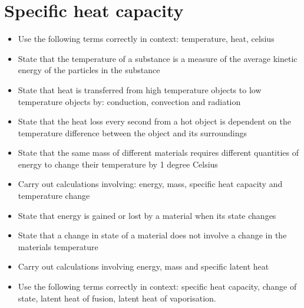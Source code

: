 \section{Specific heat capacity}
\begin{multicols}{2}
	\begin{itemize}
		\item Use the following terms correctly in context: temperature, heat, 
			celsius
		\item  State that the temperature of a substance is a measure of the average
			kinetic energy of the particles in the substance
		\item State that heat is transferred from high temperature objects to low
			temperature objects by: conduction, convection and radiation
		\item State that the heat loss every second from a hot object is dependent
			on the temperature difference between the object and its surroundings
		\item  State that the same mass of different materials requires different
			quantities of energy to change their temperature by 1 degree Celsius
		\item Carry out calculations involving: energy, mass, specific heat capacity
			and temperature change
		\item State that energy is gained or lost by a material when its state changes
		\item State that a change in state of a material does not involve a change in
			the materials temperature
		\item Carry out calculations involving energy, mass and specific latent heat
		\item Use the following terms correctly in context: specific heat capacity,
			change of state, latent heat of fusion, latent heat of vaporisation.
	\end{itemize}
\end{multicols}

